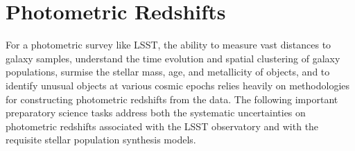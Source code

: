 \section{Photometric Redshifts}\label{sec:tasks:photo_z}  

For a photometric survey like LSST, the ability to measure
vast distances to galaxy samples, understand the time evolution
and spatial clustering of galaxy populations, surmise the
stellar mass, age, and metallicity of objects, and to identify
unusual objects at various cosmic epochs relies heavily on
methodologies for constructing photometric redshifts from the data.
The following important preparatory science tasks address both the
systematic uncertainties on photometric redshifts associated
with the LSST observatory and with the requisite
stellar population synthesis models.

